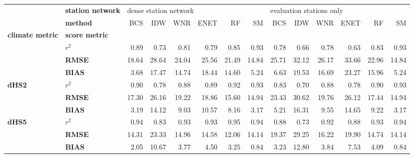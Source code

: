 \begin{table}[t]
\centering
\begin{tabular}{llrrrrrrrrrrrr}
\tophline
      & \textbf{station network} & \multicolumn{6}{l}{dense station network} & \multicolumn{6}{l}{evaluation stations only} \\
      & \textbf{method} &                   BCS &   IDW &   WNR &  ENET &    RF &    SM &                      BCS &   IDW &   WNR &  ENET &    RF &    SM \\
\textbf{climate metric} & \textbf{score metric} &                       &       &       &       &       &       &                          &       &       &       &       &       \\
\middlehline
\multirow{3}{*}{\textbf{dHS1}} & \textbf{$r^{2}$} &                  0.89 &  0.73 &  0.81 &  0.79 &  0.85 &  0.93 &                     0.78 &  0.66 &  0.78 &  0.63 &  0.83 &  0.93 \\
      & \textbf{RMSE} &                 18.64 & 28.64 & 24.04 & 25.56 & 21.49 & 14.84 &                    25.71 & 32.12 & 26.17 & 33.66 & 22.96 & 14.84 \\
      & \textbf{BIAS} &                  3.68 & 17.47 & 14.74 & 18.44 & 14.60 &  5.24 &                     6.63 & 19.53 & 16.69 & 23.27 & 15.96 &  5.24 \\
\cline{1-14}
\multirow{3}{*}{\textbf{dHS2}} & \textbf{$r^{2}$} &                  0.90 &  0.78 &  0.88 &  0.89 &  0.92 &  0.93 &                     0.83 &  0.70 &  0.88 &  0.78 &  0.90 &  0.93 \\
      & \textbf{RMSE} &                 17.30 & 26.16 & 19.22 & 18.86 & 15.60 & 14.94 &                    23.43 & 30.62 & 19.76 & 26.12 & 17.44 & 14.94 \\
      & \textbf{BIAS} &                  3.19 & 14.12 &  9.03 & 10.57 &  8.16 &  3.17 &                     5.21 & 16.31 &  9.55 & 14.65 &  9.22 &  3.17 \\
\cline{1-14}
\multirow{3}{*}{\textbf{dHS5}} & \textbf{$r^{2}$} &                  0.94 &  0.83 &  0.93 &  0.93 &  0.95 &  0.94 &                     0.88 &  0.73 &  0.92 &  0.88 &  0.93 &  0.94 \\
      & \textbf{RMSE} &                 14.31 & 23.33 & 14.96 & 14.58 & 12.06 & 14.14 &                    19.37 & 29.25 & 16.22 & 19.90 & 14.74 & 14.14 \\
      & \textbf{BIAS} &                  2.05 & 10.67 &  3.77 &  4.50 &  3.25 &  0.84 &                     3.23 & 12.80 &  3.84 &  7.53 &  4.09 &  0.84 \\

\end{tabular}
\end{table}
